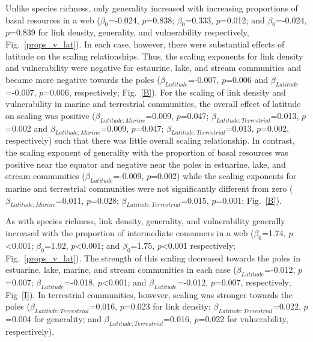 \documentclass[12pt]{article}
\begin{document}
\begin{spacing}{1.0}
  Unlike species richness, only generality increased with increasing
  proportions of basal resources in a web ($\beta_0$=-0.024, $p$=0.838;
  $\beta_0$=0.333, $p$=0.012; and $\beta_0$=-0.024, $p$=0.839 for link
  density, generality, and vulnerability respectively,
  Fig.~\ref{props_v_lat}). In each case, however, there were substantial
  effects of latitude on the scaling relationships. Thus, the scaling
  exponents for link density and vulnerability were negative for estaurine,
  lake, and stream communities and became more negative towards the poles
  ($\beta_{Latitude}$=-0.007, $p$=0.006 and $\beta_{Latitude}$=-0.007,
  $p$=0.006, respectively; Fig.~\ref{B}). For the scaling of link density and
  vulnerability in marine and terrestrial communities, the overall effect of
  latitude on scaling was positive ($\beta_{Latitude:Marine}$=0.009,
  $p$=0.047; $\beta_{Latitude:Terrestrial}$=0.013, $p$=0.002 and
  $\beta_{Latitude:Marine}$=0.009, $p$=0.047;
  $\beta_{Latitude:Terrestrial}$=0.013, $p$=0.002, respectively) such that
  there was little overall scaling relationship. In contrast, the scaling
  exponent of generality with the proportion of basal resources was positive
  near the equator and negative near the poles in estuarine, lake, and stream
  communities ($\beta_{Latitude}$=-0.009, $p$=0.002) while the scaling
  exponents for marine and terrestrial communities were not significantly
  different from zero ($\beta_{Latitude:Marine}$=0.011, $p$=0.028;
  $\beta_{Latitude:Terrestrial}$=0.015, $p$=0.001; Fig.~\ref{B}).


  As with species richness, link density, generality, and vulnerability
  generally increased with the proportion of intermediate consumers in a web
  ($\beta_0$=1.74, $p$\textless0.001; $\beta_0$=1.92, $p$\textless0.001; and
  $\beta_0$=1.75, $p$\textless0.001 respectively; Fig.~\ref{props_v_lat}).
  The strength of this scaling decreased towards the poles in estuarine,
  lake, marine, and stream communities in each case
  ($\beta_{Latitude}$=-0.012, $p$=0.007; $\beta_{Latitude}$=-0.018,
  $p$\textless0.001; and $\beta_{Latitude}$=-0.012, $p$=0.007, respectively;
  Fig~\ref{I}). In terrestrial communities, however, scaling was stronger
  towards the  poles ($\beta_{Latitude:Terrestrial}$=0.016, $p$=0.023 for
  link density; $\beta_{Latitude:Terrestrial}$=0.022, $p$=0.004 for
  generality; and $\beta_{Latitude:Terrestrial}$=0.016, $p$=0.022 for
  vulnerability, respectively).



\end{spacing}
\end{document}
